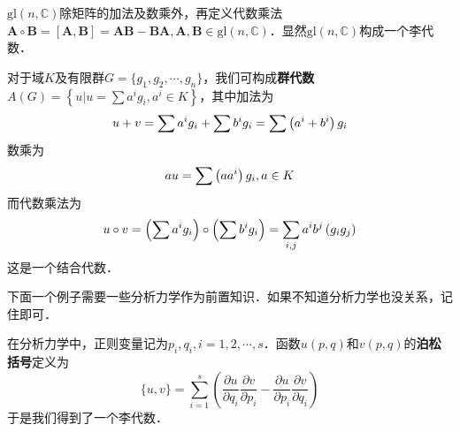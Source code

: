 \begin{example}{}
$\mathrm{gl}(n, \mathbb C)$除矩阵的加法及数乘外，再定义代数乘法$\mathbf A\circ \mathbf B=[\mathbf A, \mathbf B] = \mathbf A \mathbf B - \mathbf B\mathbf A, \mathbf A, \mathbf B\in \mathrm{gl}(n, \mathbb C)$．显然$\mathrm{gl}(n,\mathbb C)$构成一个李代数．
\end{example}

\begin{example}{}
对于域$K $及有限群$G=\{g_1,g_2,\cdots,g_n\}$，我们可构成\textbf{群代数}$\displaystyle A(G)=\left\{u | u=\sum a^{i} g_{i}, a^{i} \in K\right\}$，其中加法为
\begin{equation}
u+v=\sum a^{i} g_{i}+\sum b^{i} g_{i}=\sum\left(a^{i}+b^{i}\right) g_{i} \notag
\end{equation}
数乘为
\begin{equation}
a u=\sum\left(a a^{i}\right) g_{i}, a \in K \notag
\end{equation}
而代数乘法为
\begin{equation}
u \circ v=\left(\sum a^{i} g_{i}\right) \circ\left(\sum b^{i} g_{i}\right)=\sum_{i, j} a^{i} b^{j}\left(g_{i} g_{j}\right) \notag
\end{equation}
这是一个结合代数．
\end{example}

下面一个例子需要一些分析力学作为前置知识．如果不知道分析力学也没关系，记住即可．
\begin{example}{}
在分析力学中，正则变量记为$p_i,q_i, i=1,2,\cdots, s$．函数$u(p,q)$和$v(p, q)$的\textbf{泊松括号}定义为\begin{equation}
\{u, v\}=\sum_{i=1}^{s}\left(\frac{\partial u}{\partial q_{i}} \frac{\partial v}{\partial p_{i}}-\frac{\partial u}{\partial p_{i}} \frac{\partial v}{\partial q_{i}}\right)
\end{equation}
于是我们得到了一个李代数．
\end{example}